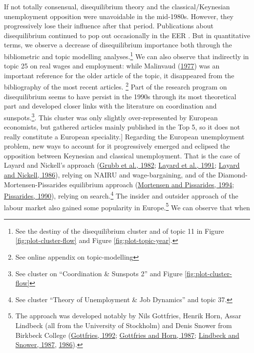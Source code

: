 \documentclass[
]{article}
\begin{document}
If not totally consensual, disequilibrium theory and the
classical/Keynesian unemployment opposition were unavoidable in the
mid-1980s. However, they progressively lose their influence after that
period. Publications about disequilibrium continued to pop out
occasionally in the EER . But in quantitative terms, we observe a
decrease of disequilibrium importance both through the bibliometric and
topic modelling analyses.\footnote{See the destiny of the disequilibrium
  cluster and of topic 11 in Figure \ref{fig:plot-cluster-flow} and
  Figure \ref{fig:plot-topic-year}.} We can also observe that indirectly
in topic 25 on real wages and employment: while Malinvaud
(\protect\hyperlink{ref-malinvaud1977}{1977}) was an important reference
for the older article of the topic, it disappeared from the bibliography
of the most recent articles. \footnote{See online appendix on
  topic-modelling} Part of the research program on disequilibrium seems
to have persist in the 1990s through its most theoretical part and
developed closer links with the literature on coordination and
sunspots.\footnote{See cluster on ``Coordination \& Sunspots 2'' and
  Figure \ref{fig:plot-cluster-flow}}. This cluster was only slightly
over-represented by European economists, but gathered articles mainly
published in the Top 5, so it does not really constitute a European
speciality.{]} Regarding the European unemployment problem, new ways to
account for it progressively emerged and eclipsed the opposition between
Keynesian and classical unemployment. That is the case of Layard and
Nickell's approach (\protect\hyperlink{ref-grubb1982}{Grubb et al.,
1982}; \protect\hyperlink{ref-layard1991a}{Layard et al., 1991};
\protect\hyperlink{ref-layard1986}{Layard and Nickell, 1986}), relying
on NAIRU and wage-bargaining, and of the Diamond-Mortensen-Pissarides
equilibrium approach (\protect\hyperlink{ref-mortensen1994}{Mortensen
and Pissarides, 1994};
\protect\hyperlink{ref-pissarides1990}{Pissarides, 1990}), relying on
search.\footnote{See cluster ``Theory of Unemployment \& Job Dynamics''
  and topic 37.} The insider and outsider approach of the labour market
also gained some popularity in Europe.\footnote{The approach was
  developed notably by Nils Gottfries, Henrik Horn, Assar Lindbeck (all
  from the University of Stockholm) and Denis Snower from Birkbeck
  College (\protect\hyperlink{ref-gottfries1992}{Gottfries, 1992};
  \protect\hyperlink{ref-gottfries1987}{Gottfries and Horn, 1987};
  \protect\hyperlink{ref-lindbeck1987a}{Lindbeck and Snower, 1987},
  \protect\hyperlink{ref-lindbeck1986}{1986}).} We can observe that when
\end{document}
